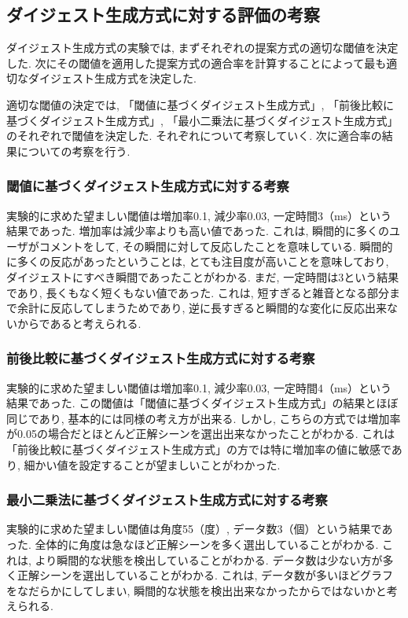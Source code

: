 \subsection{ダイジェスト生成方式に対する評価の考察}
ダイジェスト生成方式の実験では, まずそれぞれの提案方式の適切な閾値を決定した. 次にその閾値を適用した提案方式の適合率を計算することによって最も適切なダイジェスト生成方式を決定した.

適切な閾値の決定では, 「閾値に基づくダイジェスト生成方式」, 「前後比較に基づくダイジェスト生成方式」, 「最小二乗法に基づくダイジェスト生成方式」のそれぞれで閾値を決定した. それぞれについて考察していく. 次に適合率の結果についての考察を行う.

\subsubsection{閾値に基づくダイジェスト生成方式に対する考察}
実験的に求めた望ましい閾値は増加率0.1, 減少率0.03, 一定時間3（ms）という結果であった. 増加率は減少率よりも高い値であった. これは, 瞬間的に多くのユーザがコメントをして, その瞬間に対して反応したことを意味している. 瞬間的に多くの反応があったということは, とても注目度が高いことを意味しており, ダイジェストにすべき瞬間であったことがわかる. まだ, 一定時間は3という結果であり, 長くもなく短くもない値であった. これは, 短すぎると雑音となる部分まで余計に反応してしまうためであり, 逆に長すぎると瞬間的な変化に反応出来ないからであると考えられる.

\subsubsection{前後比較に基づくダイジェスト生成方式に対する考察}
実験的に求めた望ましい閾値は増加率0.1, 減少率0.03, 一定時間4（ms）という結果であった. この閾値は「閾値に基づくダイジェスト生成方式」の結果とほぼ同じであり, 基本的には同様の考え方が出来る. しかし, こちらの方式では増加率が0.05の場合だとほとんど正解シーンを選出出来なかったことがわかる. これは「前後比較に基づくダイジェスト生成方式」の方では特に増加率の値に敏感であり, 細かい値を設定することが望ましいことがわかった.

\subsubsection{最小二乗法に基づくダイジェスト生成方式に対する考察}
実験的に求めた望ましい閾値は角度55（度）, データ数3（個）という結果であった. 全体的に角度は急なほど正解シーンを多く選出していることがわかる. これは, より瞬間的な状態を検出していることがわかる. データ数は少ない方が多く正解シーンを選出していることがわかる. これは, データ数が多いほどグラフをなだらかにしてしまい, 瞬間的な状態を検出出来なかったからではないかと考えられる.

